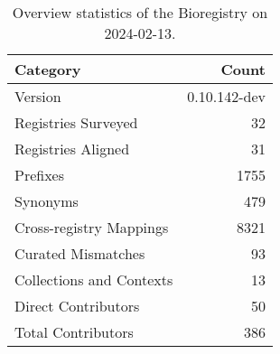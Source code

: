 \begin{table}
\caption{Overview statistics of the Bioregistry on 2024-02-13.}
\label{tab:bioregistry-summary}
\begin{tabular}{lr}
\toprule
Category & Count \\
\midrule
Version & 0.10.142-dev \\
Registries Surveyed & 32 \\
Registries Aligned & 31 \\
Prefixes & 1755 \\
Synonyms & 479 \\
Cross-registry Mappings & 8321 \\
Curated Mismatches & 93 \\
Collections and Contexts & 13 \\
Direct Contributors & 50 \\
Total Contributors & 386 \\
\bottomrule
\end{tabular}
\end{table}
